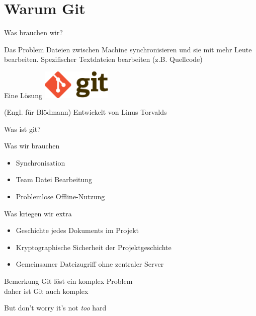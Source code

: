 \section{Warum Git}

\begin{frame}{Was brauchen wir?}
	\begin{block}{Das Problem}
		Dateien zwischen Machine synchronisieren und sie mit mehr Leute
		bearbeiten. Spezifischer Textdateien bearbeiten (z.B. Quellcode)
	\end{block}
	\pause

	\begin{block}{Eine L\"osung}
	\centering
	\vspace{1em}
	\includegraphics[width=0.25\textwidth]{pic/git.png}\\
	\vspace{1em}

	(Engl. f\"ur Bl\"odmann) Entwickelt von Linus Torvalds
	\end{block}
\end{frame}

\begin{frame}{Was ist git?}
	\begin{block}{Was wir brauchen}
	\begin{itemize}
		\item Synchronisation
		\item Team Datei Bearbeitung
		\item Problemlose Offline-Nutzung
	\end{itemize}
	\end{block}
	\pause

	\begin{block}{Was kriegen wir extra}
	\begin{itemize}
		\item Geschichte jedes Dokuments im Projekt
		\item Kryptographische Sicherheit der Projektgeschichte
		\item Gemeinsamer Dateizugriff ohne zentraler Server 
	\end{itemize}
	\end{block}
\end{frame}

\begin{frame}[c]{Bemerkung}
	\centering
	{\LARGE  
	Git l\"ost ein komplex Problem \\
	daher ist Git auch komplex
	}

	{\footnotesize
		But don't worry it's not \emph{too} hard
	}
\end{frame}

